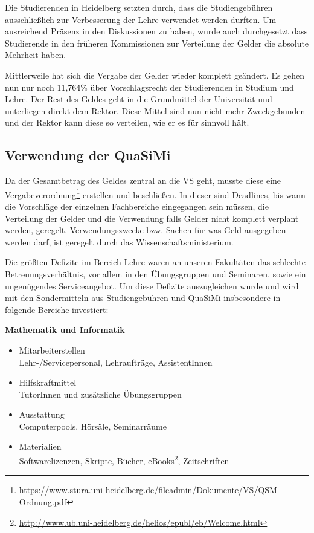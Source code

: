 Die Studierenden in Heidelberg setzten durch, dass die Studiengebühren ausschließlich zur Verbesserung der Lehre verwendet werden durften. Um ausreichend Präsenz in den Diskussionen zu haben, wurde auch durchgesetzt dass Studierende in den früheren Kommissionen zur Verteilung der Gelder die absolute Mehrheit haben. 

Mittlerweile hat sich die Vergabe der Gelder wieder komplett geändert. Es gehen nun nur noch 11,764\% über Vorschlagsrecht der Studierenden in Studium und Lehre. Der Rest des Geldes geht in die Grundmittel der Universität und unterliegen direkt dem Rektor. Diese Mittel sind nun nicht mehr Zweckgebunden und der Rektor kann diese so verteilen, wie er es für sinnvoll hält. 


\subsection*{Verwendung der QuaSiMi}

Da der Gesamtbetrag des Geldes zentral an die VS geht, musste diese eine Vergabeverordnung\footnote{\url{https://www.stura.uni-heidelberg.de/fileadmin/Dokumente/VS/QSM-Ordnung.pdf}} erstellen und beschließen. In dieser sind Deadlines, bis wann die Vorschläge der einzelnen Fachbereiche eingegangen sein müssen, die Verteilung der Gelder und die Verwendung falls Gelder nicht komplett verplant werden, geregelt. Verwendungszwecke bzw. Sachen für was Geld ausgegeben werden darf, ist geregelt durch das Wissenschaftsministerium.

Die größten Defizite im Bereich Lehre waren an unseren Fakultäten das schlechte Betreuungsverhältnis, vor allem in den Übungsgruppen und Seminaren, sowie ein ungenügendes Serviceangebot. Um diese Defizite auszugleichen wurde und wird mit den Sondermitteln aus Studiengebühren und QuaSiMi insbesondere in folgende Bereiche investiert:

\vspace{5mm}
\textbf{Mathematik und Informatik}
\begin{itemize}
 \item {Mitarbeiterstellen}\\Lehr-/Servicepersonal, Lehraufträge, AssistentInnen
\item {Hilfskraftmittel}\\ TutorInnen und zusätzliche Übungsgruppen
\item {Ausstattung}\\ Computerpools, Hörsäle, Seminarräume
\item {Materialien}\\ Softwarelizenzen, Skripte, Bücher, eBooks\footnote{\url{http://www.ub.uni-heidelberg.de/helios/epubl/eb/Welcome.html}}, Zeitschriften
\end{itemize}

